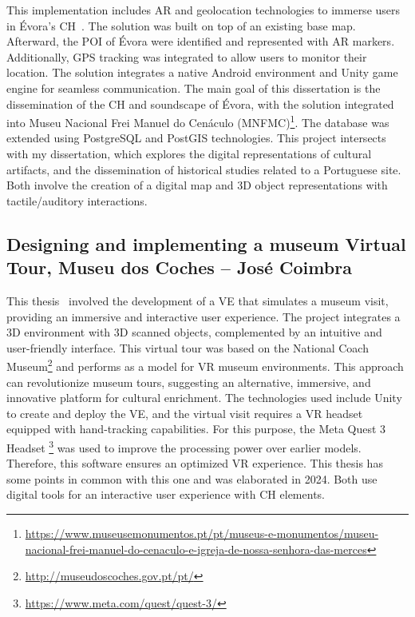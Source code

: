 This implementation includes \gls{AR} and geolocation technologies to immerse users in Évora's \gls{CH}~\cite{vilar2024extended}.
The solution was built on top of an existing base map. Afterward, the \gls{POI} of Évora were identified and represented with \gls{AR} markers. Additionally, GPS tracking was
  integrated to allow users to monitor their location.
The solution integrates a native Android environment and Unity game engine for seamless communication. The main goal of this dissertation is the dissemination of the \gls{CH} 
and soundscape of Évora, with the solution integrated into Museu Nacional Frei Manuel do Cenáculo (MNFMC)\footnote{\url{https://www.museusemonumentos.pt/pt/museus-e-monumentos/museu-nacional-frei-manuel-do-cenaculo-e-igreja-de-nossa-senhora-das-merces}}. 
The database was extended using PostgreSQL and PostGIS technologies.
This project intersects with my dissertation, which explores the digital representations of cultural artifacts, and the dissemination of historical studies related to a Portuguese site. 
Both involve the creation of a digital map and \gls{3D} object representations with tactile/auditory interactions.

\subsection{Designing and implementing a museum Virtual Tour, Museu dos Coches – José Coimbra}
\label{sec:thesis2_nova}

This thesis~\cite{tese_tourCoimbra2024} involved the development of a \gls{VE} that simulates a museum visit, providing an immersive and interactive user experience. The project integrates a \gls{3D} environment 
with \gls{3D} scanned objects, complemented by an intuitive and user-friendly interface. 
This virtual tour was based on the National Coach Museum\footnote{\url{http://museudoscoches.gov.pt/pt/}} and performs as a model for \gls{VR} museum environments. This approach can revolutionize 
museum tours, suggesting an alternative, immersive, and innovative platform for cultural enrichment. 
The technologies used include Unity to create and deploy the \gls{VE}, and the virtual visit requires a \gls{VR} headset equipped with hand-tracking capabilities. For this purpose, 
the Meta Quest 3 Headset \footnote{\url{https://www.meta.com/quest/quest-3/}} was used to improve the processing power over earlier models. Therefore, this software ensures an optimized \gls{VR} experience. 
This thesis has some points in common with this one and was elaborated in 2024. Both use digital tools for an interactive user experience with \gls{CH} elements.


